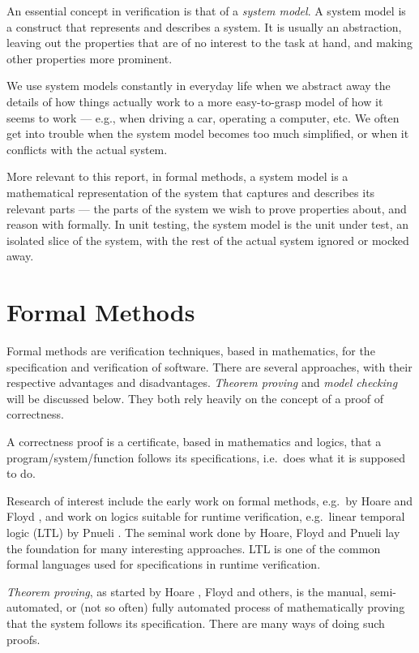 \documentclass[a4paper,11pt]{kth-mag}
\begin{document}
An essential concept in verification is that of a \textit{system model}. A
system model is a construct that represents and describes a system. It is
usually an abstraction, leaving out the properties that are of no interest to
the task at hand, and making other properties more prominent.

We use system models constantly in everyday life when we abstract away the
details of how things actually work to a more easy-to-grasp model of how it
seems to work --- e.g., when driving a car, operating a computer, etc. We often
get into trouble when the system model becomes too much simplified, or when it
conflicts with the actual system.

More relevant to this report, in formal methods, a system model is a
mathematical representation of the system that captures and describes its
relevant parts --- the parts of the system we wish to prove properties about,
and reason with formally. In unit testing, the system model is the unit under
test, an isolated slice of the system, with the rest of the actual system
ignored or mocked away.


\section{Formal Methods} \label{section-formal-methods}

Formal methods are verification techniques, based in mathematics, for the
specification and verification of software. There are several approaches, with
their respective advantages and disadvantages. \textit{Theorem proving} and
\textit{model checking} will be discussed below. They both rely heavily on the
concept of a proof of correctness.

A correctness proof is a certificate, based in mathematics and logics, that a
program/system/function follows its specifications, i.e.\ does what it is
supposed to do.

Research of interest include the early work on formal methods, e.g.\ by Hoare
\cite{hoare69} and Floyd \cite{floyd67}, and work on logics suitable for
runtime verification, e.g.\ linear temporal logic (LTL) by Pnueli
\cite{pnueli77}. The seminal work done by Hoare, Floyd and Pnueli lay the
foundation for many interesting approaches. LTL is one of the common formal
languages used for specifications in runtime verification.

\textit{Theorem proving}, as started by Hoare \cite{hoare69}, Floyd
\cite{floyd67} and others, is the manual, semi-automated, or (not so often)
fully automated process of mathematically proving that the system follows its
specification. There are many ways of doing such proofs.
\end{document}
